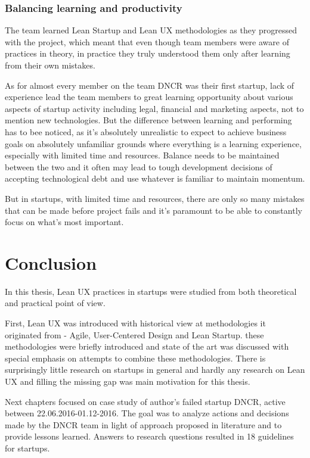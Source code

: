 \documentclass{article}
\begin{document}
\subsubsection{Balancing learning and productivity}
The team learned Lean Startup and Lean UX methodologies as they progressed with the project, which meant that even though team members were aware of practices in theory, in practice they truly understood them only after learning from their own mistakes.

As for almost every member on the team DNCR was their first startup, lack of experience lead the team members to great learning opportunity about various aspects of startup activity including legal, financial and marketing aspects, not to mention new technologies. But the difference between learning and performing has to bee noticed, as it's absolutely unrealistic to expect to achieve business goals on absolutely unfamiliar grounds where everything is a learning experience, especially with limited time and resources. Balance needs to be maintained between the two and it often may lead to tough development decisions of accepting technological debt and use whatever is familiar to maintain momentum.

But in startups, with limited time and resources, there are only so many mistakes that can be made before project fails and it's paramount to be able to constantly focus on what's most important.

\section{Conclusion}
In this thesis, Lean UX practices in startups were studied from both theoretical and practical point of view.

First, Lean UX was introduced with historical view at methodologies it originated from - Agile, User-Centered Design and Lean Startup. these methodologies were briefly introduced and state of the art was discussed with special emphasis on attempts to combine these methodologies. There is surprisingly little research on startups in general and hardly any research on Lean UX and filling the missing gap was main motivation for this thesis.

Next chapters focused on case study of author's failed startup DNCR, active between 22.06.2016-01.12-2016. The goal was to analyze actions and decisions made by the DNCR team in light of approach proposed in literature and to provide lessons learned. Answers to research questions resulted in 18 guidelines for startups.
\end{document}
